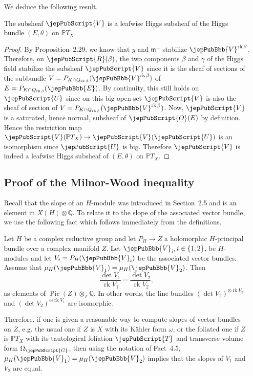 We deduce the following result.
\begin{proposition}
The subsheaf $\jepPubScript{V}$ is a leafwise Higgs subsheaf of the Higgs bundle $(E,\theta)$ on $\mathbb PT_X$.
\end{proposition}
\begin{proof}
By Proposition~2.29, we know that $y$ and $\mathfrak m^+$ stabilize $\jepPubBbb{V}^{\operatorname{rk}\beta}$. Therefore, on $\jepPubScript{R}(\beta)$, the two components $\beta$ and $\gamma$ of the Higgs field stabilize the subsheaf $\jepPubScript{V}$ since it is the sheaf of sections of the subbundle $V=P_{K\cap Q_{\operatorname{rk}\beta}}(\jepPubBbb{V}^{\operatorname{rk}\beta})$ of $E=P_{K\cap Q_{\operatorname{rk}\beta}}(\jepPubBbb{E})$. By continuity, this still holds on $\jepPubScript{U}$ since on this big open set $\jepPubScript{V}$ is also the sheaf of section of $V=P_{K\cap Q_{\operatorname{rk}\beta}}(\jepPubBbb{V}^{\operatorname{rk}\beta})$. Now, $\jepPubScript{V}$ is a saturated, hence normal, subsheaf of $\jepPubScript{O}(E)$ by definition. Hence the restriction map $\jepPubScript{V}(\mathbb PT_X)\to\jepPubScript{V}(\jepPubScript{U})$ is an isomorphism since $\jepPubScript{U}$ is big. Therefore $\jepPubScript{V}$ is indeed a leafwise Higgs subsheaf of $(E,\theta)$ on $\mathbb PT_X$.
\end{proof}
\subsection{Proof of the Milnor-Wood inequality}
Recall that the slope of an $H$-module was introduced in Section~2.5 and is an element in $X(H)\otimes\mathbb Q$. To relate it to the slope of the associated vector bundle, we use the following fact which follows immediately from the definitions.
\begin{fact}
Let $H$ be a complex reductive group and let $P_H\to Z$ a holomorphic $H$-principal bundle over a complex manifold $Z$. Let $\jepPubBbb{V}_i,i\in\{1,2\}$, be $H$-modules and let $V_i=P_H(\jepPubBbb{V}_i)$ be the associated vector bundles. Assume that $\mu_H(\jepPubBbb{V}_1)=\mu_H(\jepPubBbb{V}_2)$. Then
\[
\frac{\det V_1}{\operatorname{rk}V_1}=\frac{\det V_2}{\operatorname{rk}V_2},
\]
as elements of $\operatorname{Pic}(Z)\otimes_{\mathbb Z}\mathbb Q$. In other words, the line bundles $(\det V_1)^{\otimes\operatorname{rk}V_2}$ and $(\det V_2)^{\otimes\operatorname{rk}V_1}$ are isomorphic.
\end{fact}
Therefore, if one is given a reasonable way to compute slopes of vector bundles on $Z$, e.g. the usual one if $Z$ is $X$ with its Kähler form $\omega$, or the foliated one if $Z$ is $\mathbb PT_X$ with its tautological foliation $\jepPubScript{T}$ and transverse volume form $\Omega_{\jepPubScript{G}}$, then using the notation of Fact~4.5, $\mu_H(\jepPubBbb{V}_1)=\mu_H(\jepPubBbb{V}_2)$ implies that the slopes of $V_1$ and $V_2$ are equal.

